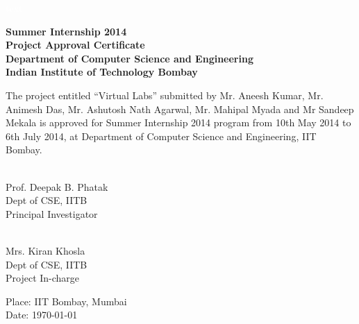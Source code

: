 \documentclass[12pt]{report}
\begin{document}
 \pagebreak \textcolor{white}{text} \pagebreak
\thispagestyle{empty}

\begin{center}
\thispagestyle{empty}
\LARGE
\textbf{Summer Internship 2014 \\ Project Approval Certificate} \\
\vskip12pt
\Large
\textbf{Department of Computer Science and Engineering} \\
\vskip5pt
\textbf{Indian Institute of Technology Bombay} \\
\end{center}
\vfill
\normalsize
The project entitled ``Virtual Labs'' submitted by Mr. Aneesh Kumar, Mr. Animesh Das, Mr. Ashutosh Nath Agarwal, Mr. Mahipal Myada and Mr Sandeep Mekala is approved for Summer Internship 2014 program from 10th May 2014 to 6th July 2014, at Department of Computer Science and Engineering, IIT Bombay.

\vfill

\begin{multicols}{2}
\underline{\hspace{5cm}} \\
\indent Prof. Deepak B. Phatak \\
\indent Dept of CSE, IITB \\
\indent Principal Investigator \\

\begin{flushright}
\underline{\hspace{5cm}} \\
 Mrs. Kiran Khosla\\
\indent Dept of CSE, IITB \\
\indent Project In-charge \\
\end{flushright}
\end{multicols}

\vfill
%
% 
 
 \vfill
 Place: IIT Bombay, Mumbai \\
\indent Date: \today
\end{document}
